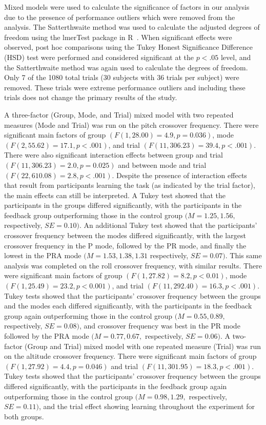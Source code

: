 Mixed models were used to calculate the significance of factors in our analysis due to the presence of performance outliers which were removed from the analysis.
The Satterthwaite method was used to calculate the adjusted degrees of freedom using the lmerTest package in R~\citep{RN53}.
When significant effects were observed, post hoc comparisons using the Tukey Honest Significance Difference (HSD) test were performed and considered significant at the $p < .05$ level, and the Satterthwaite method was again used to calculate the degrees of freedom.
Only 7 of the 1080 total trials (30 subjects with 36 trials per subject) were removed.
These trials were extreme performance outliers and including these trials does not change the primary results of the study.

A three-factor (Group, Mode, and Trial) mixed model with two repeated measures (Mode and Trial) was run on the pitch crossover frequency.
There were significant main factors of group $(F(1, 28.00) = 4.9, p = 0.036)$, mode $(F(2, 55.62) = 17.1, p < .001)$, and trial $(F(11, 306.23) = 39.4, p < .001)$.
There were also significant interaction effects between group and trial $(F(11, 306.23) = 2.0, p = 0.025)$ and between mode and trial $(F(22, 610.08) = 2.8, p < .001)$.
Despite the presence of interaction effects that result from participants learning the task (as indicated by the trial factor), the main effects can still be interpreted.
A Tukey test showed that the participants in the groups differed significantly, with the participants in the feedback group outperforming those in the control group $(M = 1.25, 1.56,$ respectively, $SE = 0.10)$.
An additional Tukey test showed that the participants' crossover frequency between the modes differed significantly, with the largest crossover frequency in the P mode, followed by the PR mode, and finally the lowest in the PRA mode $(M = 1.53, 1.38, 1.31$ respectively, $SE = 0.07)$.
This same analysis was completed on the roll crossover frequency, with similar results.
There were significant main factors of group $(F(1, 27.82) = 8.2, p < 0.01)$, mode $(F(1, 25.49) = 23.2, p < 0.001)$, and trial $(F(11, 292.40) = 16.3, p < .001)$.
Tukey tests showed that the participants' crossover frequency between the groups and the modes each differed significantly, with the participants in the feedback group again outperforming those in the control group $(M = 0.55, 0.89,$ respectively, $SE = 0.08)$, and crossover frequency was best in the PR mode followed by the PRA mode $(M = 0.77, 0.67,$ respectively, $SE = 0.06)$.
A two-factor (Group and Trial) mixed model with one repeated measure (Trial) was run on the altitude crossover frequency.
There were significant main factors of group $(F(1, 27.92) = 4.4, p = 0.046)$ and trial $(F(11, 301.95) = 18.3, p < .001)$.
Tukey tests showed that the participants' crossover frequency between the groups differed significantly, with the participants in the feedback group again outperforming those in the control group $(M = 0.98, 1.29,$ respectively, $SE = 0.11)$, and the trial effect showing learning throughout the experiment for both groups.

